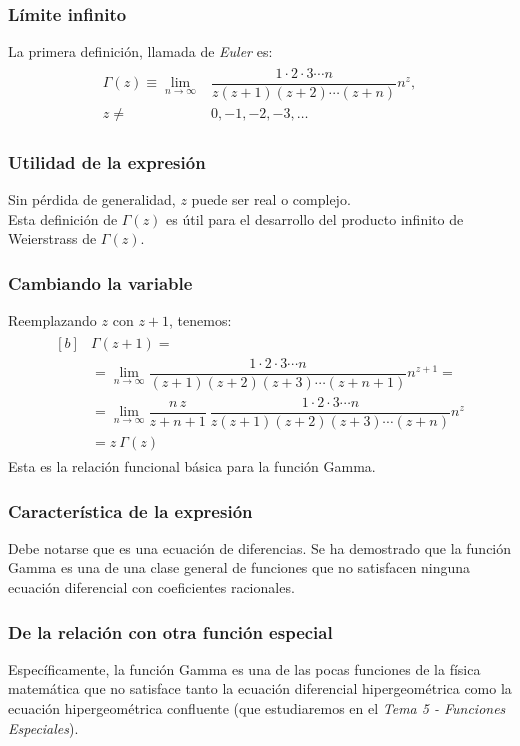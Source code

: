 \documentclass[12pt]{beamer}
\begin{document}
\begin{frame}
\frametitle{Límite infinito}
La primera definición, llamada de \emph{Euler} es:
\pause
\begin{eqnarray}
\begin{aligned}
\Gamma(z) \equiv \lim_{n \to \infty} &\dfrac{1 \cdot 2 \cdot 3 \cdots n}{z (z + 1) (z + 2) \cdots (z + n)} n^{z}, \\ 
z \neq &0, -1,-2,-3, \ldots
\label{eq:ecuacion_10_01}
\end{aligned}
\end{eqnarray}
\end{frame}
\begin{frame}
\frametitle{Utilidad de la expresión}
Sin pérdida de generalidad, $z$ puede ser real o complejo.
\\
\bigskip
\pause
Esta definición de $\Gamma(z)$ es útil para el desarrollo del producto infinito de Weierstrass de $\Gamma (z)$.
\end{frame}
\begin{frame}
\frametitle{Cambiando la variable}
Reemplazando $z$ con $z + 1$, tenemos:
\pause
\begin{align}
\begin{aligned}[b]
&\Gamma (z + 1) = \\[0.5em]
&= \lim_{n \to \infty} \dfrac{1 \cdot 2 \cdot 3 \cdots n}{(z {+} 1)(z {+} 2)(z {+} 3) \cdots (z {+} n {+} 1)} n^{z {+} 1} = \\[0.5em]
&= \lim_{n \to \infty} \dfrac{n \, z}{z {+} n {+} 1} \: \dfrac{1 \cdot 2 \cdot 3 \cdots n}{z (z {+} 1)(z {+} 2)(z {+} 3) \cdots (z {+} n)} n^{z} \\[0.5em]
&= z \: \Gamma (z)
\label{eq:ecuacion_10_02}
\end{aligned}
\end{align}
\fontsize{12}{12}\selectfont
Esta es la relación funcional básica para la función Gamma.
\end{frame}
\begin{frame}
\frametitle{Característica de la expresión}
Debe notarse que es una ecuación de diferencias. Se ha demostrado que la función Gamma es una de una clase general de funciones que no satisfacen ninguna ecuación diferencial con coeficientes racionales.
\end{frame}
\begin{frame}
\frametitle{De la relación con otra función especial}
Específicamente, la función Gamma es una de las pocas funciones de la física matemática que no satisface tanto la ecuación diferencial hipergeométrica como la ecuación hipergeométrica confluente (que estudiaremos en el \emph{Tema 5 - Funciones Especiales}).
\end{frame}
\end{document}
